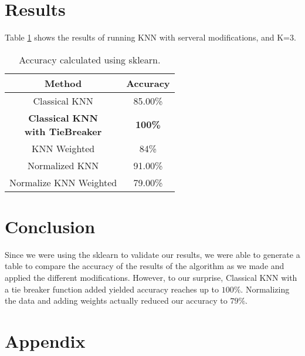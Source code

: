 \documentclass{article}
\begin{document}
 \section{Results} 
 
 
 
 Table \ref{tab:AccuarcyTable} shows the results of running  KNN with serveral modifications, and K=3.   
 
 
\setlength{\tabcolsep}{0.9em} %
{\renewcommand{\arraystretch}{1.5}%
\begin{table}[H]

\begin{tabular}{|c|c|}
\hline 
\textbf{Method}                    & \textbf{Accuracy}  \\ \hline
Classical KNN                      & 85.00\%                    
\\ \hline
  \pbox{100cm}{\textbf{Classical KNN} \\ \textbf{with TieBreaker}\\} & \textbf{100\%}                      \\\hline
KNN Weighted                       & 84\%                       \\ \hline
Normalized KNN                     & 91.00\%                    \\ \hline
Normalize KNN Weighted             & 79.00\%      
\\ \hline             
\end{tabular}
\caption{\label{tab:AccuarcyTable}Accuracy calculated using sklearn.}
\end{table}
}

\section{Conclusion}
Since we were using the sklearn to validate our results, we were able to generate a table to compare the accuracy of the results of the algorithm as we made and applied the different modifications. However, to our surprise, Classical KNN with a tie breaker function added yielded accuracy reaches up to $100\%$. Normalizing the data and adding weights actually reduced our accuracy to $79\%$. 
 
 
 \section{Appendix}


  
 
\end{document}
